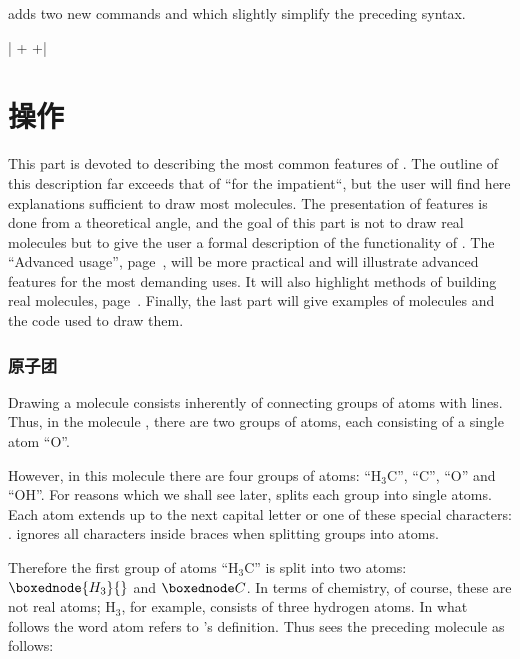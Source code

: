 \documentclass[10pt]{article}
\begin{document}
\CF adds two new commands \idx{\chemsign} and \idx{\chemrel} which slightly simplify the preceding syntax.

|\setchemrel{0pt}{1.2em}{6em}
\chemsign[0.5cm]+
\chemsign[0.5cm]+|
\newpage

\part{\protect\CF 操作}
This part is devoted to describing the most common features of \CF. The outline of this description far exceeds that of ``\CF for the impatient``, but the user will find here explanations sufficient to draw most molecules. The presentation of features is done from a theoretical angle, and the goal of this part is not to draw real molecules but to give the user a formal description of the functionality of \CF. The ``Advanced usage'', page~\pageref{utilisation.avancee}, will be more practical and will illustrate advanced features for the most demanding uses. It will also highlight methods of building real molecules, page~\pageref{exemples.commentes}. Finally, the last part will give examples of molecules and the code used to draw them.

\section{原子团}
Drawing a molecule consists inherently of connecting groups of atoms with lines. Thus, in the molecule , there are two groups of atoms, each consisting of a single atom ``O''.

{
However, in this molecule
there are four groups of atoms: ``$\mathrm{H_3C}$'', ``C'', ``O'' and ``OH''. For reasons which we shall see later, \CF splits each group into single atoms. Each atom extends up to the next capital letter or one of these special characters: {\ttfamily \boxedfalseverb{-} \boxedfalseverb{=} \boxedfalseverb{~} \boxedfalseverb{(} \boxedfalseverb{!} \boxedfalseverb{*} \boxedfalseverb{<} \boxedfalseverb{>} }. \CF ignores all characters inside braces when splitting groups into atoms.

Therefore the first group of atoms ``$\mathrm{H_3C}$'' is split into two atoms: $\boxednode{H_3}{}$ and $\boxednode C{}$. In terms of chemistry, of course, these are not real atoms; $\mathrm{H_3}$, for example, consists of three hydrogen atoms. In what follows the word atom refers to \CF's definition. Thus \CF sees the preceding molecule as follows:
\renewcommand*\printatom[1]{\fbox{\ensuremath{\mathrm{#1}}}}
}
\end{document}
